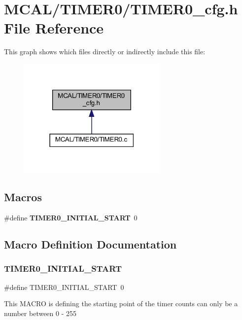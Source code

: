 \section{M\+C\+A\+L/\+T\+I\+M\+E\+R0/\+T\+I\+M\+E\+R0\+\_\+cfg.h File Reference}
\label{_t_i_m_e_r0__cfg_8h}
This graph shows which files directly or indirectly include this file\+:\nopagebreak
\begin{figure}[H]
\begin{center}
\leavevmode
\includegraphics[width=207pt]{_t_i_m_e_r0__cfg_8h__dep__incl}
\end{center}
\end{figure}
\subsection*{Macros}
\begin{DoxyCompactItemize}
\item 
\#define \textbf{ T\+I\+M\+E\+R0\+\_\+\+I\+N\+I\+T\+I\+A\+L\+\_\+\+S\+T\+A\+RT}~0
\end{DoxyCompactItemize}


\subsection{Macro Definition Documentation}
\mbox{\label{_t_i_m_e_r0__cfg_8h_a258e8280aa84229b8782be363c19df8b}} 
\subsubsection{T\+I\+M\+E\+R0\+\_\+\+I\+N\+I\+T\+I\+A\+L\+\_\+\+S\+T\+A\+RT}
{\footnotesize\ttfamily \#define T\+I\+M\+E\+R0\+\_\+\+I\+N\+I\+T\+I\+A\+L\+\_\+\+S\+T\+A\+RT~0}

This M\+A\+C\+RO is defining the starting point of the timer counts can only be a number between 0 -\/ 255 